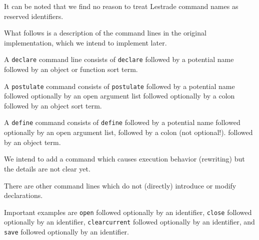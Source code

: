 \documentclass[12pt]{article}
\begin{document}
It can be noted that we find no reason to treat Lestrade command names as reserved identifiers.

What follows is a description of the command lines in the original implementation, which we intend to implement later.

A {\tt declare} command line consists of {\tt declare} followed by a potential name followed by an object or function sort term.

A {\tt postulate} command consists of {\tt postulate} followed by a potential name followed optionally by an open argument list followed optionally by a colon followed by an object sort term.

A {\tt define} command consists of {\tt define} followed by a potential name followed optionally by an open argument list, followed by a colon (not optional!). followed by an object term.

We intend to add a command which causes execution behavior (rewriting) but the details are not clear yet.

There are other command lines which do not (directly) introduce or modify declarations.

Important examples are {\tt open} followed optionally by an identifier, {\tt close} followed optionally by an identifier, {\tt clearcurrent} followed optionally by an identifier, and
{\tt save} followed optionally by an identifier.
\end{document}
